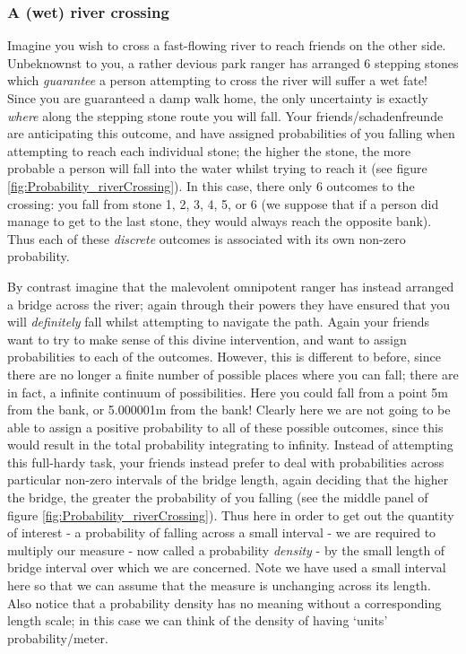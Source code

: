 \documentclass[11pt,fullpage]{book}
\begin{document}
\subsubsection{A (wet) river crossing}
Imagine you wish to cross a fast-flowing river to reach friends on the other side. Unbeknownst to you, a rather devious park ranger has arranged 6 stepping stones which \textit{guarantee} a person attempting to cross the river will suffer a wet fate! Since you are guaranteed a damp walk home, the only uncertainty is exactly \textit{where} along the stepping stone route you will fall. Your friends/schadenfreunde are anticipating this outcome, and have assigned probabilities of you falling when attempting to reach each individual stone; the higher the stone, the more probable a person will fall into the water whilst trying to reach it (see figure \ref{fig:Probability_riverCrossing}). In this case, there only 6 outcomes to the crossing: you fall from stone 1, 2, 3, 4, 5, or 6 (we suppose that if a person did manage to get to the last stone, they would always reach the opposite bank). Thus each of these \textit{discrete} outcomes is associated with its own non-zero probability. 

By contrast imagine that the malevolent omnipotent ranger has instead arranged a bridge across the river; again through their powers they have ensured that you will \textit{definitely} fall whilst attempting to navigate the path. Again your friends want to try to make sense of this divine intervention, and want to assign probabilities to each of the outcomes. However, this is different to before, since there are no longer a finite number of possible places where you can fall; there are in fact, a infinite continuum of possibilities. Here you could fall from a point 5m from the bank, or 5.000001m from the bank! Clearly here we are not going to be able to assign a positive probability to all of these possible outcomes, since this would result in the total probability integrating to infinity. Instead of attempting this full-hardy task, your friends instead prefer to deal with probabilities across particular non-zero intervals of the bridge length, again deciding that the higher the bridge, the greater the probability of you falling (see the middle panel of figure \ref{fig:Probability_riverCrossing}). Thus here in order to get out the quantity of interest - a probability of falling across a small interval - we are required to multiply our measure - now called a probability \textit{density} - by the small length of bridge interval over which we are concerned. Note we have used a small interval here so that we can assume that the measure is unchanging across its length. Also notice that a probability density has no meaning without a corresponding length scale; in this case we can think of the density of having `units' probability/meter.  
\end{document}
